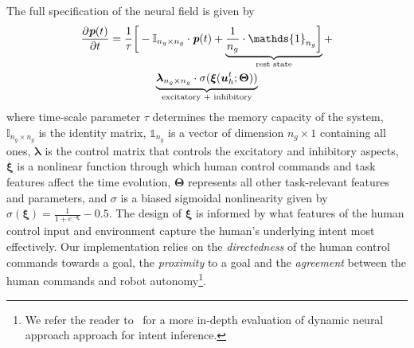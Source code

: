 \documentclass[letterpaper, 10 pt, conference]{ieeeconf}  %
\begin{document}
The full specification of the neural field is given by
\begin{multline}\label{eq:dft}
	\frac{\partial \textit{\textbf{p}}(t)}{\partial t} = \frac{1}{\tau}\bigg[-\mathbb{I}_{n_g\times n_g}\cdot\textit{\textbf{p}}(t) + \underbrace{\frac{1}{n_g}\cdot\mathds{1}_{n_g}\bigg]}_{\text{rest state}} + \\ \underbrace{\boldsymbol{\lambda}_{n_g\times n_g}\cdot\sigma(\boldsymbol{\xi}(\boldsymbol{u}_h^t;\boldsymbol{\Theta}))}_{\text{excitatory + inhibitory}}
\end{multline}
where time-scale parameter $\tau$ determines the memory capacity of the system, $\mathbb{I}_{n_g\times n_g}$ is the identity matrix, $\mathds{1}_{n_g}$ is a vector of dimension $n_g \times 1$ containing all ones, $\boldsymbol{\lambda}$ is the control matrix that controls the excitatory and inhibitory aspects, $\boldsymbol{\xi}$ is a nonlinear function through which human control commands and task features affect the time evolution, $\boldsymbol{\Theta}$ represents all other task-relevant features and parameters, and $\sigma$ is a biased sigmoidal nonlinearity given by $\sigma(\boldsymbol{\xi}) = \frac{1}{1 + e^{-\boldsymbol{\xi}}} - 0.5$. 
The design of $\boldsymbol{\xi}$ is informed by what features of the human control input and environment capture the human's underlying intent most effectively. Our implementation relies on the \textit{directedness} of the human control commands towards a goal, the \textit{proximity} to a goal and the \textit{agreement} between the human commands and robot autonomy\footnote{We refer the reader to~\cite{gopinath2018dnf} for a more in-depth evaluation of dynamic neural approach approach for intent inference.}.
\end{document}
